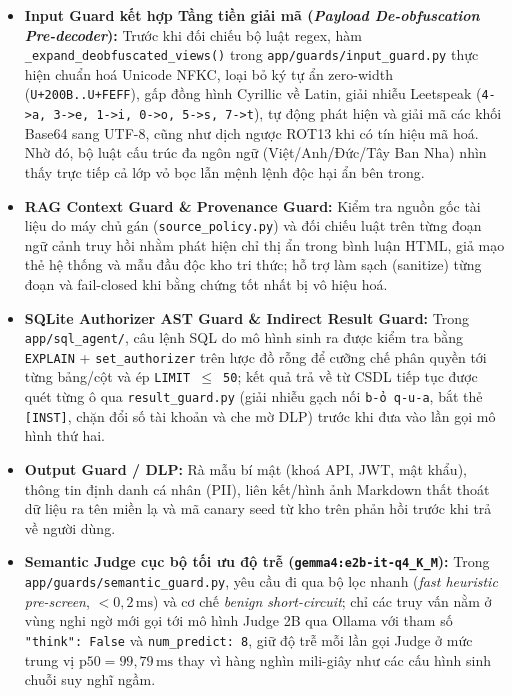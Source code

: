 \begin{itemize}
    \item \textbf{Input Guard kết hợp Tầng tiền giải mã (\emph{Payload De-obfuscation Pre-decoder}):} Trước khi đối chiếu bộ luật regex, hàm \texttt{\_\allowbreak expand\_\allowbreak deobfuscated\_\allowbreak views()} trong \texttt{app/\allowbreak guards/\allowbreak input\_\allowbreak guard.\allowbreak py} thực hiện chuẩn hoá Unicode NFKC, loại bỏ ký tự ẩn zero-width (\texttt{U+200B..\allowbreak U+FEFF}), gấp đồng hình Cyrillic về Latin, giải nhiễu Leetspeak (\texttt{4->a, 3->e, 1->i, 0->o, 5->s, 7->t}), tự động phát hiện và giải mã các khối Base64 sang UTF-8, cũng như dịch ngược ROT13 khi có tín hiệu mã hoá. Nhờ đó, bộ luật cấu trúc đa ngôn ngữ (Việt/Anh/Đức/Tây Ban Nha) nhìn thấy trực tiếp cả lớp vỏ bọc lẫn mệnh lệnh độc hại ẩn bên trong.
    \item \textbf{RAG Context Guard \& Provenance Guard:} Kiểm tra nguồn gốc tài liệu do máy chủ gán (\texttt{source\_\allowbreak policy.\allowbreak py}) và đối chiếu luật trên từng đoạn ngữ cảnh truy hồi nhằm phát hiện chỉ thị ẩn trong bình luận HTML, giả mạo thẻ hệ thống và mẫu đầu độc kho tri thức; hỗ trợ làm sạch (sanitize) từng đoạn và fail-closed khi bằng chứng tốt nhất bị vô hiệu hoá.
    \item \textbf{SQLite Authorizer AST Guard \& Indirect Result Guard:} Trong \texttt{app/\allowbreak sql\_\allowbreak agent/}, câu lệnh SQL do mô hình sinh ra được kiểm tra bằng \texttt{EXPLAIN} + \texttt{set\_\allowbreak authorizer} trên lược đồ rỗng để cưỡng chế phân quyền tới từng bảng/cột và ép \texttt{LIMIT $\le$ 50}; kết quả trả về từ CSDL tiếp tục được quét từng ô qua \texttt{result\_\allowbreak guard.\allowbreak py} (giải nhiễu gạch nối \texttt{b-ỏ q-u-a}, bắt thẻ \texttt{[INST]}, chặn đổi số tài khoản và che mờ DLP) trước khi đưa vào lần gọi mô hình thứ hai.
    \item \textbf{Output Guard / DLP:} Rà mẫu bí mật (khoá API, JWT, mật khẩu), thông tin định danh cá nhân (PII), liên kết/hình ảnh Markdown thất thoát dữ liệu ra tên miền lạ và mã canary seed từ kho trên phản hồi trước khi trả về người dùng.
    \item \textbf{Semantic Judge cục bộ tối ưu độ trễ (\texttt{gemma4:e2b-\allowbreak it-\allowbreak q4\_\allowbreak K\_\allowbreak M}):} Trong \texttt{app/\allowbreak guards/\allowbreak semantic\_\allowbreak guard.\allowbreak py}, yêu cầu đi qua bộ lọc nhanh (\emph{fast heuristic pre-screen}, $< 0{,}2\,\text{ms}$) và cơ chế \emph{benign short-circuit}; chỉ các truy vấn nằm ở vùng nghi ngờ mới gọi tới mô hình Judge 2B qua Ollama với tham số \texttt{"think": False} và \texttt{num\_\allowbreak predict: 8}, giữ độ trễ mỗi lần gọi Judge ở mức trung vị $\text{p50} = 99{,}79\,\text{ms}$ thay vì hàng nghìn mili-giây như các cấu hình sinh chuỗi suy nghĩ ngầm.
\end{itemize}

